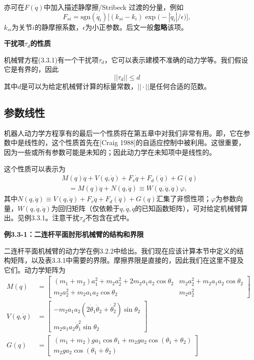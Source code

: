 \documentclass[12pt,a4paper]{ctexart}
\begin{document}
亦可在$F(\dot{q})$中加入描述静摩擦/Stribeck 过渡的分量，例如
\begin{equation}\label{eq:3.3.60}
F_{si} = \mathrm{sgn}(\dot{q}_i)\bigl[(k_{si}-k_i)\exp\bigl(-|\dot{q}_i|/\epsilon\bigr)\bigr],
\end{equation}
$k_{si}$为关节$i$的静摩擦系数，$\epsilon$为小正参数。后文一般\textbf{忽略}该项。

\textbf{干扰项$\tau_d$的性质}

机械臂方程(3.3.1)有一个干扰项$\tau_d$，它可以表示建模不准确的动力学等。我们假设它是有界的，因此
\begin{equation}
||\tau_d|| \leq d
\end{equation}
其中$d$是可以为给定机械臂计算的标量常数，$||\cdot||$是任何合适的范数。

\subsection{参数线性}

机器人动力学方程享有的最后一个性质将在第五章中对我们非常有用。即，它在参数中是线性的，这个性质首先在[Craig 1988]的自适应控制中被利用。这很重要，因为一些或所有参数可能是未知的；因此动力学在未知项中是线性的。

这个性质可以表示为
\begin{equation}\label{eq:3.3.62}
\begin{aligned}
&M(q)\ddot{q} + V(q,\dot{q}) + F_v\dot{q} + F_d(\dot{q}) + G(q) \\
&\quad = M(q)\ddot{q} + N(q,\dot{q}) \equiv W(q,\dot{q},\ddot{q})\varphi,
\end{aligned}
\end{equation}
其中$N(q,\dot{q})\equiv V(q,\dot{q})+F_v\dot{q}+F_d(\dot{q})+G(q)$汇集了非惯性项；$\varphi$为参数向量，$W(q,\dot{q},\ddot{q})$为回归矩阵（仅依赖于$q,\dot{q},\ddot{q}$的已知函数矩阵），可对给定机械臂算出。见例3.3.1。注意干扰$\tau_d$不包含在式中。

\textbf{例3.3-1：二连杆平面肘形机械臂的结构和界限}

二连杆平面机械臂的动力学在例3.2.2中给出。我们现在应该计算本节中定义的结构矩阵，以及表3.3.1中需要的界限。摩擦界限是直接的，因此我们在这里不提及它们。动力学矩阵为
\begin{align}
M(q) &= \begin{bmatrix} (m_1+m_2)a_1^2 + m_2a_2^2 + 2m_2a_1a_2\cos\theta_2 & m_2a_2^2 + m_2a_1a_2\cos\theta_2 \\ m_2a_2^2 + m_2a_1a_2\cos\theta_2 & m_2a_2^2 \end{bmatrix} \\
V(q,\dot{q}) &= \begin{bmatrix} -m_2a_1a_2(2\dot{\theta}_1\dot{\theta}_2 + \dot{\theta}_2^2)\sin\theta_2 \\ m_2a_1a_2\dot{\theta}_1^2\sin\theta_2 \end{bmatrix} \\
G(q) &= \begin{bmatrix} (m_1+m_2)ga_1\cos\theta_1 + m_2ga_2\cos(\theta_1+\theta_2) \\ m_2ga_2\cos(\theta_1+\theta_2) \end{bmatrix}
\end{align}
\end{document}
